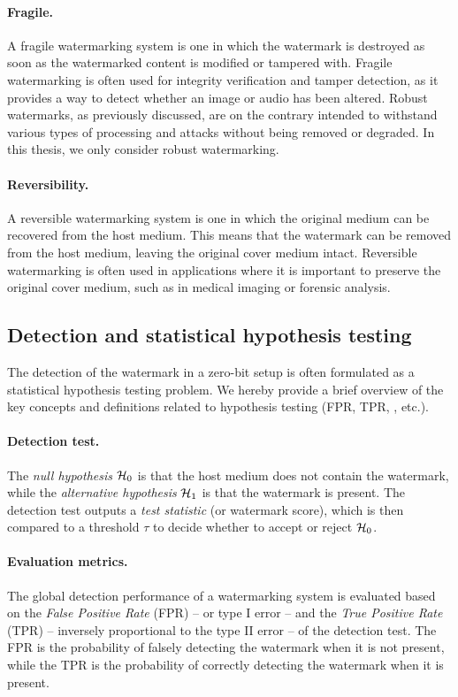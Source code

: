 \paragraph*{Fragile.}
A fragile watermarking system is one in which the watermark is destroyed as soon as the watermarked content is modified or tampered with.
Fragile watermarking is often used for integrity verification and tamper detection, as it provides a way to detect whether an image or audio has been altered.
Robust watermarks, as previously discussed, are on the contrary intended to withstand various types of processing and attacks without being removed or degraded.
In this thesis, we only consider robust watermarking.

\paragraph*{Reversibility.}
A reversible watermarking system is one in which the original medium can be recovered from the host medium. 
This means that the watermark can be removed from the host medium, leaving the original cover medium intact. 
Reversible watermarking is often used in applications where it is important to preserve the original cover medium, such as in medical imaging or forensic analysis.



\subsection{Detection and statistical hypothesis testing}\label{chap0/sec:test}

The detection of the watermark in a zero-bit setup is often formulated as a statistical hypothesis testing problem.
We hereby provide a brief overview of the key concepts and definitions related to hypothesis testing (FPR, TPR, \pval, etc.).

\paragraph*{Detection test.}
The \emph{null hypothesis} $\mathcal{H}_0$ is that the host medium does not contain the watermark, while the \emph{alternative hypothesis} $\mathcal{H}_1$ is that the watermark is present.
The detection test outputs a \emph{\gls*{test statistic}} (or watermark score), which is then compared to a threshold $\tau$ to decide whether to accept or reject $\mathcal{H}_0$.

\paragraph*{Evaluation metrics.}
The global detection performance of a watermarking system is evaluated based on the \emph{False Positive Rate} (\Gls*{FPR}) -- or type I error -- and the \emph{True Positive Rate} (\Gls*{TPR}) -- inversely proportional to the type II error -- of the detection test.
The FPR is the probability of falsely detecting the watermark when it is not present, while the TPR is the probability of correctly detecting the watermark when it is present.

